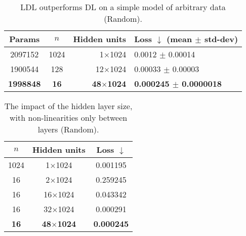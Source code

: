 \documentclass{article}
\begin{document}
\begin{table}
\begin{center}
\begin{tabular}{ccrl}
\hline
Params & $n$ & Hidden units & Loss $\downarrow$ (mean $\pm$ std-dev) \\
\hline
2097152 & 1024 & 1$\times$1024 & 0.0012 $\pm$ 0.00014 \\
1900544 & 128 & 12$\times$1024 & 0.00033 $\pm$ 0.00003 \\
\textbf{1998848} & \textbf{16} & \textbf{48$\times$1024} & \textbf{0.000245 $\pm$ 0.0000018} \\
\hline
\end{tabular}
\end{center}
\caption{LDL outperforms DL on a simple model of arbitrary data (Random).}
\label{randomLDLvsDL}
\end{table}

\begin{table}
\begin{center}
\begin{tabular}{ccc}
\hline
$n$ & Hidden units & Loss $\downarrow$ \\
\hline
1024 & 1$\times$1024 & 0.001195 \\
\hline
16 & 2$\times$1024 & 0.259245 \\
16 & 16$\times$1024 & 0.043342 \\
16 & 32$\times$1024 & 0.000291 \\
\textbf{16} & \textbf{48$\times$1024} & \textbf{0.000245} \\
\hline
\end{tabular}
\end{center}
\caption{The impact of the hidden layer size, with non-linearities only between layers (Random).}
\label{LDLscaling}
\end{table}
\end{document}
